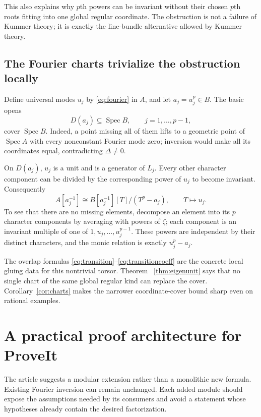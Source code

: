 \documentclass[11pt,a4paper]{article}
\theoremstyle{definition}
\theoremstyle{remark}
\newcommand{\Spec}{\operatorname{Spec}}
\begin{document}
This also explains why $p$th powers can be invariant without their chosen
$p$th roots fitting into one global regular coordinate. The obstruction is
not a failure of Kummer theory; it is exactly the line-bundle alternative
allowed by Kummer theory.

\subsection{The Fourier charts trivialize the obstruction locally}

Define universal modes $u_j$ by \eqref{eq:fourier} in $A$, and let
$a_j=u_j^p\in B$. The basic opens
\[
 D(a_j)\subseteq\Spec B,\qquad j=1,\ldots,p-1,
\]
cover $\Spec B$. Indeed, a point missing all of them lifts to a geometric
point of $\Spec A$ with every nonconstant Fourier mode zero; inversion
would make all its coordinates equal, contradicting $\Delta\neq0$.

On $D(a_j)$, $u_j$ is a unit and is a generator of $L_j$. Every other
character component can be divided by the corresponding power of $u_j$
to become invariant. Consequently
\begin{equation}
 A[a_j^{-1}]\cong
 B[a_j^{-1}][T]/(T^p-a_j),\qquad T\longmapsto u_j.
 \label{eq:localKummer}
\end{equation}
To see that there are no missing elements, decompose an element into its
$p$ character components by averaging with powers of $\zeta$; each
component is an invariant multiple of one of $1,u_j,\ldots,u_j^{p-1}$.
These powers are independent by their distinct characters, and the monic
relation is exactly $u_j^p-a_j$.

The overlap formulas \eqref{eq:transition}--\eqref{eq:transitioncoeff}
are the concrete local gluing data for this nontrivial torsor. Theorem~
\ref{thm:eigenunit} says that no single chart of the same global regular
kind can replace the cover. Corollary~\ref{cor:charts} makes the narrower
coordinate-cover bound sharp even on rational examples.

\section{A practical proof architecture for ProveIt}
\label{sec:formalization}

The article suggests a modular extension rather than a monolithic new
formula. Existing Fourier inversion can remain unchanged. Each added
module should expose the assumptions needed by its consumers and avoid a
statement whose hypotheses already contain the desired factorization.
\end{document}
